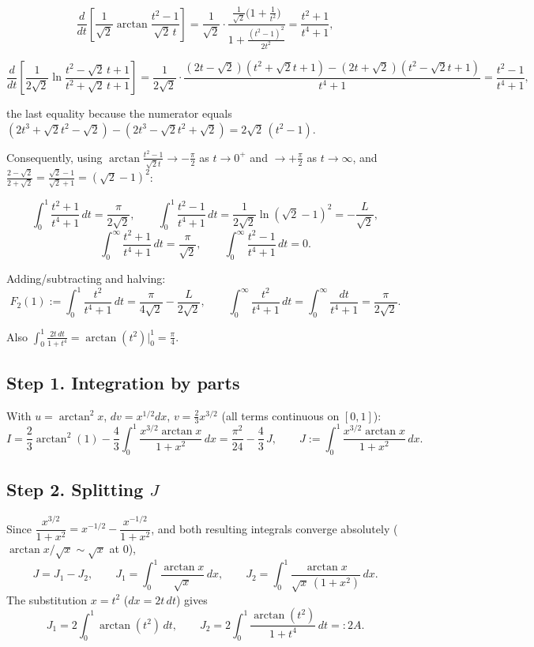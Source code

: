 \documentclass[11pt]{article}
\theoremstyle{remark}
\begin{document}
\[\frac{d}{dt}\left[\frac{1}{\sqrt2}\arctan\frac{t^2-1}{\sqrt2\,t}\right]
=\frac{1}{\sqrt2}\cdot\frac{\frac{1}{\sqrt2}\bigl(1+\frac1{t^2}\bigr)}{1+\frac{(t^2-1)^2}{2t^2}}
=\frac{t^2+1}{t^4+1},\]

\[\frac{d}{dt}\left[\frac{1}{2\sqrt2}\ln\frac{t^2-\sqrt2\,t+1}{t^2+\sqrt2\,t+1}\right]
=\frac{1}{2\sqrt2}\cdot\frac{(2t-\sqrt2)(t^2+\sqrt2 t+1)-(2t+\sqrt2)(t^2-\sqrt2 t+1)}{t^4+1}
=\frac{t^2-1}{t^4+1},\]

the last equality because the numerator equals $(2t^3+\sqrt2t^2-\sqrt2)-(2t^3-\sqrt2t^2+\sqrt2)=2\sqrt2\,(t^2-1)$.

Consequently, using $\arctan\frac{t^2-1}{\sqrt2 t}\to-\frac\pi2$ as $t\to0^+$ and $\to+\frac\pi2$ as $t\to\infty$, and $\frac{2-\sqrt2}{2+\sqrt2}=\frac{\sqrt2-1}{\sqrt2+1}=(\sqrt2-1)^2$:

\[\int_0^1\frac{t^2+1}{t^4+1}\,dt=\frac{\pi}{2\sqrt2},\qquad
\int_0^1\frac{t^2-1}{t^4+1}\,dt=\frac{1}{2\sqrt2}\ln(\sqrt2-1)^2=-\frac{L}{\sqrt2},\]
\[\int_0^\infty\frac{t^2+1}{t^4+1}\,dt=\frac{\pi}{\sqrt2},\qquad
\int_0^\infty\frac{t^2-1}{t^4+1}\,dt=0 .\]

Adding/subtracting and halving:
\begin{equation*}
F_2(1):=\int_0^1\frac{t^2}{t^4+1}\,dt=\frac{\pi}{4\sqrt2}-\frac{L}{2\sqrt2},
\qquad
\int_0^\infty\frac{t^2}{t^4+1}\,dt=\int_0^\infty\frac{dt}{t^4+1}=\frac{\pi}{2\sqrt2}. \tag{0}
\end{equation*}

Also $\displaystyle\int_0^1\frac{2t\,dt}{1+t^4}=\arctan(t^2)\Big|_0^1=\frac\pi4$.

\subsection*{Step 1. Integration by parts}

With $u=\arctan^2x$, $dv=x^{1/2}dx$, $v=\tfrac23x^{3/2}$ (all terms continuous on $[0,1]$):
\begin{equation*}
I=\frac23\arctan^2(1)-\frac43\int_0^1\frac{x^{3/2}\arctan x}{1+x^2}\,dx
=\frac{\pi^2}{24}-\frac43\,J,\qquad
J:=\int_0^1\frac{x^{3/2}\arctan x}{1+x^2}\,dx. \tag{1}
\end{equation*}

\subsection*{Step 2. Splitting $J$}

Since $\dfrac{x^{3/2}}{1+x^2}=x^{-1/2}-\dfrac{x^{-1/2}}{1+x^2}$, and both resulting integrals converge absolutely ($\arctan x/\sqrt x\sim\sqrt x$ at $0$),
\[J=J_1-J_2,\qquad
J_1=\int_0^1\frac{\arctan x}{\sqrt x}\,dx,\qquad
J_2=\int_0^1\frac{\arctan x}{\sqrt x\,(1+x^2)}\,dx .\]
The substitution $x=t^2$ ($dx=2t\,dt$) gives
\begin{equation*}
J_1=2\int_0^1\arctan(t^2)\,dt,\qquad
J_2=2\int_0^1\frac{\arctan(t^2)}{1+t^4}\,dt=:2A. \tag{2}
\end{equation*}
\end{document}
